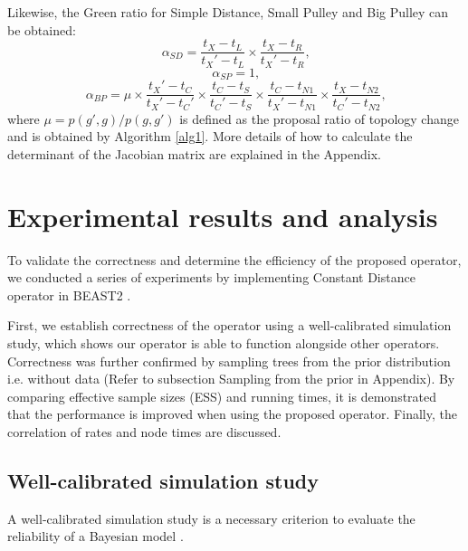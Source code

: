 \documentclass{bmcart}
\begin{document}
Likewise, the Green ratio for Simple Distance, Small Pulley and  Big Pulley can be obtained:
\begin{equation}\label{HR2}
{\alpha_{SD}} = \frac{{{t_X} - {t_L}}}{{{t_X}' - {t_L}}} \times \frac{{{t_X} - {t_R}}}{{{t_X}' - {t_R}}}\text{,}
\end{equation}
\begin{equation}\label{HR3}
{\alpha_{SP}}  = 1\text{,}
\end{equation}
\begin{equation}\label{HR4}
{\alpha_{BP}} = \mu \times \frac{{{t_X}' - {t_C}}}{{{t_X}' - {t_C}'}} \times \frac{{{t_C} - {t_S}}}{{{t_C}' - {t_S}}} \times \frac{{{t_C} - {t_{N1}}}}{{{t_X}' - {t_{N1}}}} \times \frac{{{t_X} - {t_{N2}}}}{{{t_C}' - {t_{N2}}}}\text{,}
\end{equation}
where $\mu = p(g', g) / p(g, g')$ is defined as the proposal ratio of topology change and is obtained by Algorithm \ref{alg1}. More details of how to calculate the determinant of the Jacobian matrix are explained in the Appendix.

\section*{Experimental results and analysis}
To validate the correctness and determine the efficiency of the proposed operator, we conducted a series of experiments by implementing Constant Distance operator in BEAST2 \cite{bouckaert2014beast}.

First, we establish correctness of the operator using a well-calibrated simulation study, which shows our operator is able to function alongside other operators. Correctness was further confirmed by sampling trees from the prior distribution i.e. without data (Refer to subsection Sampling from the prior in Appendix). By comparing effective sample sizes (ESS) \cite{Tracer} and running times, it is demonstrated that the performance is improved when using the proposed operator. Finally, the correlation of rates and node times are discussed.

\subsection*{Well-calibrated simulation study}
A well-calibrated simulation study is a necessary criterion to evaluate the reliability of a Bayesian model \cite{dawid1982well}.
\end{document}
